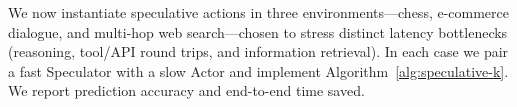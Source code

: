 \documentclass{article} %
\theoremstyle{plain} %
\theoremstyle{definition} %
\theoremstyle{remark} %
\begin{document}
We now instantiate speculative actions in three environments---chess, e-commerce dialogue, and multi-hop web search---chosen 
to stress distinct latency bottlenecks (reasoning, tool/API round trips, and information retrieval).
In each case we pair a fast Speculator with a slow Actor and implement Algorithm~\ref{alg:speculative-k}. We report prediction accuracy and end-to-end time saved. 


\label{sec:environments}










\end{document}
